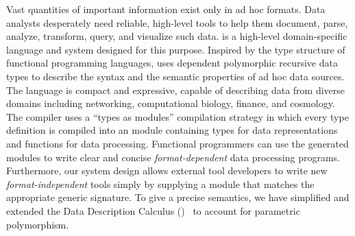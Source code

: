 Vast quantities of important information exist only in ad hoc formats.  
Data analysts desperately need reliable, high-level tools to 
help them document, parse, analyze, transform, query, and visualize such data.  
\padsml{} is a high-level domain-specific language and system
designed for this purpose.  
Inspired by the type structure of functional
programming languages, \padsml{} uses dependent
polymorphic recursive data types to describe the syntax and the semantic properties of ad hoc data sources.  The language is compact and expressive, capable of describing data from diverse domains including networking, computational biology, finance, and cosmology. 
The \padsml{} compiler uses a ``types as modules'' compilation strategy
in which every \padsml{} type definition is compiled into
an \ocaml{} module containing types for data representations
and functions for data processing.  Functional programmers
can use the generated modules to write clear and concise {\em format-dependent}
data processing programs.  Furthermore, our system design
allows external tool developers to write new {\em format-independent} tools
simply by supplying a module that matches the appropriate generic
signature.  
To give \padsml{} a precise semantics, we have simplified and extended the Data Description Calculus (\ddc)~\cite{fisher+:next700ddl} to account for parametric polymorphism.


